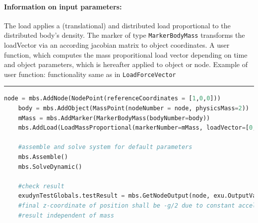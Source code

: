 \paragraph{Information on input parameters:} 
\finishTable
 \noindent
    The load applies a (translational) and distributed load proportional to the distributed body's density.
    The marker of type \texttt{MarkerBodyMass} transforms the loadVector via an according jacobian matrix to object coordinates.
    A user function, which computes the mass proporitional load vector depending on time and object parameters, which is hereafter applied to object or node.
    \finishTable
    Example of user function: functionality same as in \texttt{LoadForceVector}
\vspace{6pt}\par\noindent\rule{\textwidth}{0.4pt}
\label{miniExample_LoadMassProportional}
\pythonstyle
\begin{lstlisting}[language=Python, firstnumber=1]
    node = mbs.AddNode(NodePoint(referenceCoordinates = [1,0,0]))
    body = mbs.AddObject(MassPoint(nodeNumber = node, physicsMass=2))
    mMass = mbs.AddMarker(MarkerBodyMass(bodyNumber=body))
    mbs.AddLoad(LoadMassProportional(markerNumber=mMass, loadVector=[0,0,-9.81]))

    #assemble and solve system for default parameters
    mbs.Assemble()
    mbs.SolveDynamic()

    #check result
    exudynTestGlobals.testResult = mbs.GetNodeOutput(node, exu.OutputVariableType.Position)[2]
    #final z-coordinate of position shall be -g/2 due to constant acceleration with g=-9.81
    #result independent of mass
\end{lstlisting}

